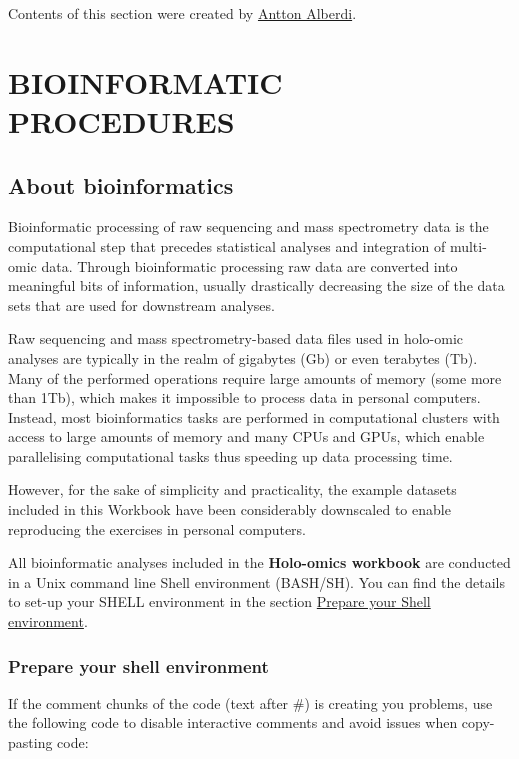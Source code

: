 \documentclass[
]{book}
\begin{document}
Contents of this section were created by \protect\hyperlink{antton-alberdi}{Antton Alberdi}.

\hypertarget{part-bioinformatic-procedures}{%
\part{BIOINFORMATIC PROCEDURES}\label{part-bioinformatic-procedures}}

\hypertarget{about-bioinformatics}{%
\chapter{About bioinformatics}\label{about-bioinformatics}}

Bioinformatic processing of raw sequencing and mass spectrometry data is the computational step that precedes statistical analyses and integration of multi-omic data. Through bioinformatic processing raw data are converted into meaningful bits of information, usually drastically decreasing the size of the data sets that are used for downstream analyses.

Raw sequencing and mass spectrometry-based data files used in holo-omic analyses are typically in the realm of gigabytes (Gb) or even terabytes (Tb). Many of the performed operations require large amounts of memory (some more than 1Tb), which makes it impossible to process data in personal computers. Instead, most bioinformatics tasks are performed in computational clusters with access to large amounts of memory and many CPUs and GPUs, which enable parallelising computational tasks thus speeding up data processing time.

However, for the sake of simplicity and practicality, the example datasets included in this Workbook have been considerably downscaled to enable reproducing the exercises in personal computers.

All bioinformatic analyses included in the \textbf{Holo-omics workbook} are conducted in a Unix command line Shell environment (BASH/SH). You can find the details to set-up your SHELL environment in the section \protect\hyperlink{prepare-shell}{Prepare your Shell environment}.

\hypertarget{prepare-shell}{%
\section{Prepare your shell environment}\label{prepare-shell}}

If the comment chunks of the code (text after \#) is creating you problems, use the following code to disable interactive comments and avoid issues when copy-pasting code:
\end{document}

